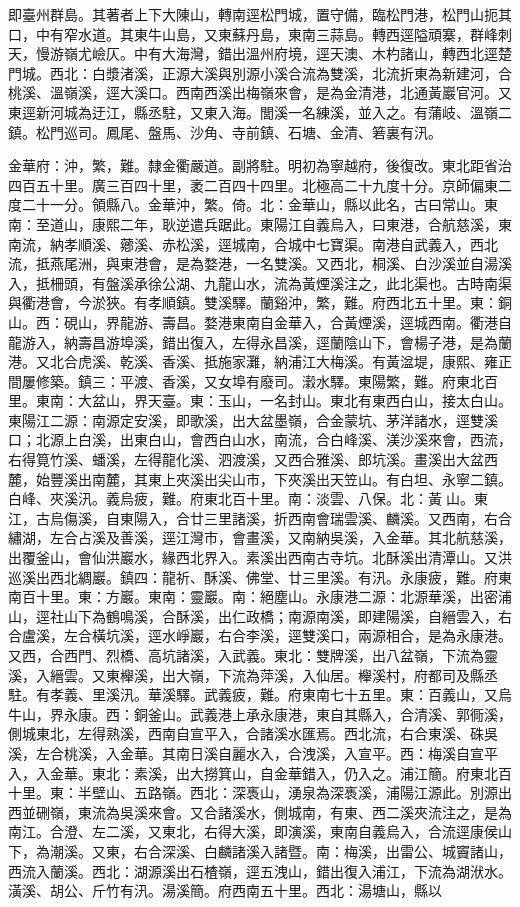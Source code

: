 \begin{pinyinscope}
即臺州群島。其著者上下大陳山，轉南逕松門城，置守備，臨松門港，松門山扼其口，中有窄水道。其東牛山島，又東蘇丹島，東南三蒜島。轉西逕隘頑寨，群峰刺天，慢游嶺尤嶮仄。中有大海灣，錯出溫州府境，逕天澳、木杓諸山，轉西北逕楚門城。西北：白漿渚溪，正源大溪與別源小溪合流為雙溪，北流折東為新建河，合桃溪、溫嶺溪，逕大溪口。西南西溪出梅嶺來會，是為金清港，北通黃巖官河。又東逕新河城為迂江，縣丞駐，又東入海。閭溪一名練溪，並入之。有蒲岐、溫嶺二鎮。松門巡司。鳳尾、盤馬、沙角、寺前鎮、石塘、金清、箬裏有汛。

金華府：沖，繁，難。隸金衢嚴道。副將駐。明初為寧越府，後復改。東北距省治四百五十里。廣三百四十里，袤二百四十四里。北極高二十九度十分。京師偏東二度二十一分。領縣八。金華沖，繁。倚。北：金華山，縣以此名，古曰常山。東南：至道山，康熙二年，耿逆遣兵踞此。東陽江自義烏入，曰東港，合航慈溪，東南流，納孝順溪、薌溪、赤松溪，逕城南，合城中七寶渠。南港自武義入，西北流，抵燕尾洲，與東港會，是為婺港，一名雙溪。又西北，桐溪、白沙溪並自湯溪入，抵柵頭，有盤溪承徐公湖、九龍山水，流為黃煙溪注之，此北渠也。古時南渠與衢港會，今淤狹。有孝順鎮。雙溪驛。蘭谿沖，繁，難。府西北五十里。東：銅山。西：硯山，界龍游、壽昌。婺港東南自金華入，合黃煙溪，逕城西南。衢港自龍游入，納壽昌游埠溪，錯出復入，左得永昌溪，逕蘭陰山下，會楊子港，是為蘭港。又北合虎溪、乾溪、香溪、抵施家灘，納浦江大梅溪。有黃湓堤，康熙、雍正間屢修築。鎮三：平渡、香溪，又女埠有廢司。瀔水驛。東陽繁，難。府東北百里。東南：大盆山，界天臺。東：玉山，一名封山。東北有東西白山，接太白山。東陽江二源：南源定安溪，即歌溪，出大盆墨嶺，合金蒙坑、茅洋諸水，逕雙溪口；北源上白溪，出東白山，會西白山水，南流，合白峰溪、渼沙溪來會，西流，右得筧竹溪、蟠溪，左得龍化溪、泗渡溪，又西合雅溪、郎坑溪。畫溪出大盆西麓，始豐溪出南麓，其東上夾溪出尖山巿，下夾溪出天笠山。有白坦、永寧二鎮。白峰、夾溪汛。義烏疲，難。府東北百十里。南：淡雲、八保。北：黃山。東江，古烏傷溪，自東陽入，合廿三里諸溪，折西南會瑞雲溪、麟溪。又西南，右合繡湖，左合占溪及善溪，逕江灣巿，會畫溪，又南納吳溪，入金華。其北航慈溪，出覆釜山，會仙洪巖水，緣西北界入。素溪出西南古寺坑。北酥溪出清潭山。又洪巡溪出西北綢巖。鎮四：龍祈、酥溪、佛堂、廿三里溪。有汛。永康疲，難。府東南百十里。東：方巖。東南：靈巖。南：絕塵山。永康港二源：北源華溪，出密浦山，逕社山下為鶴鳴溪，合酥溪，出仁政橋；南源南溪，即建陽溪，自縉雲入，右合盧溪，左合橫坑溪，逕水崢巖，右合李溪，逕雙溪口，兩源相合，是為永康港。又西，合西門、烈橋、高坑諸溪，入武義。東北：雙牌溪，出八盆嶺，下流為靈溪，入縉雲。又東櫸溪，出大嶺，下流為萍溪，入仙居。櫸溪村，府都司及縣丞駐。有孝義、里溪汛。華溪驛。武義疲，難。府東南七十五里。東：百義山，又烏牛山，界永康。西：銅釜山。武義港上承永康港，東自其縣入，合清溪、郭衕溪，側城東北，左得熟溪，西南自宣平入，合諸溪水匯焉。西北流，右合東溪、硃吳溪，左合桃溪，入金華。其南日溪自麗水入，合洩溪，入宣平。西：梅溪自宣平入，入金華。東北：素溪，出大撈箕山，自金華錯入，仍入之。浦江簡。府東北百十里。東：半壁山、五路嶺。西北：深褭山，湧泉為深褭溪，浦陽江源此。別源出西並硎嶺，東流為吳溪來會。又合諸溪水，側城南，有東、西二溪夾流注之，是為南江。合澄、左二溪，又東北，右得大溪，即演溪，東南自義烏入，合流逕康侯山下，為潮溪。又東，右合深溪、白麟諸溪入諸暨。南：梅溪，出雷公、城竇諸山，西流入蘭溪。西北：湖源溪出石楂嶺，逕五洩山，錯出復入浦江，下流為湖洑水。潢溪、胡公、斤竹有汛。湯溪簡。府西南五十里。西北：湯塘山，縣以
\end{pinyinscope}
